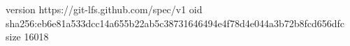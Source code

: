 version https://git-lfs.github.com/spec/v1
oid sha256:eb6e81a533dcc14a655b22ab5c38731646494e4f78d4e044a3b72b8fcd656dfc
size 16018
